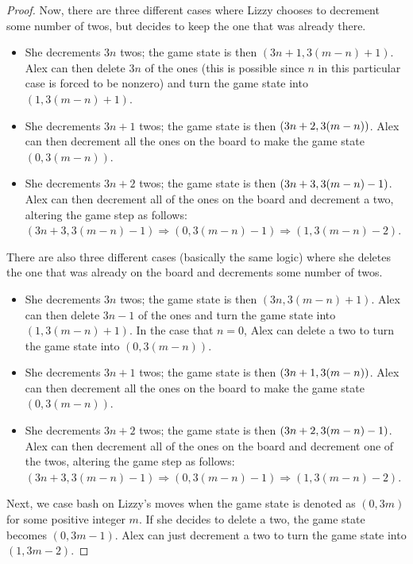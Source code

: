 \documentclass[10pt]{../usamts}
\begin{document}
\begin{solution}
\begin{proof}
    Now, there are three different cases where Lizzy chooses to decrement some number of twos, but decides to keep the one that was already there.
    \begin{itemize}
        \item She decrements $3n$ twos; the game state is then $(3n+1, 3(m-n)+1)$. Alex can then delete $3n$ of the ones (this is possible since $n$ in this particular case is forced to be nonzero) and turn the game state into $(1, 3(m-n)+1)$.
        \item She decrements $3n+1$ twos; the game state is then $\left( 3n+2, 3(m-n) \right)$. Alex can then decrement all the ones on the board to make the game state $(0,3(m-n))$.
        \item She decrements $3n+2$ twos; the game state is then $\left( 3n+3, 3(m-n)-1 \right)$. Alex can then decrement all of the ones on the board and decrement a two, altering the game step as follows: $(3n+3, 3(m-n)-1) \Rightarrow (0,3(m-n)-1) \Rightarrow (1, 3(m-n)-2)$.
    \end{itemize}
    There are also three different cases (basically the same logic) where she deletes the one that was already on the board and decrements some number of twos.
    \begin{itemize}
        \item She decrements $3n$ twos; the game state is then $(3n, 3(m-n)+1)$. Alex can then delete $3n-1$ of the ones and turn the game state into $(1, 3(m-n)+1)$. In the case that $n=0$, Alex can delete a two to turn the game state into $(0, 3(m-n))$.
        \item She decrements $3n+1$ twos; the game state is then $\left( 3n+1, 3(m-n) \right)$. Alex can then decrement all the ones on the board to make the game state $(0,3(m-n))$.
        \item She decrements $3n+2$ twos; the game state is then $\left( 3n+2, 3(m-n)-1 \right)$. Alex can then decrement all of the ones on the board and decrement one of the twos, altering the game step as follows: $(3n+3, 3(m-n)-1) \Rightarrow (0,3(m-n)-1) \Rightarrow (1, 3(m-n)-2)$.
    \end{itemize}

    Next, we case bash on Lizzy's moves when the game state is denoted as $(0, 3m)$ for some positive integer $m$.
    If she decides to delete a two, the game state becomes $(0, 3m-1)$. Alex can just decrement a two to turn the game state into $(1, 3m-2)$.


\end{proof}
\end{solution}
\end{document}
